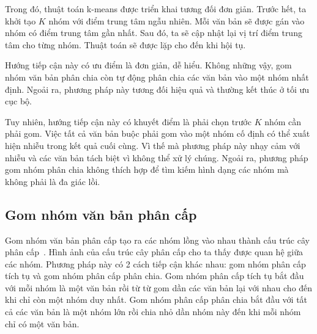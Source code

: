 Trong đó, thuật toán k-means được triển khai tương đối đơn giản.
Trước hết, ta khởi tạo $K$ nhóm với điểm trung tâm ngẫu nhiên.
Mỗi văn bản sẽ được gán vào nhóm có điểm trung tâm gần nhất.
Sau đó, ta sẽ cập nhật lại vị trí điểm trung tâm cho từng nhóm.
Thuật toán sẽ được lặp cho đến khi hội tụ.

Hướng tiếp cận này có ưu điểm là đơn giản, dễ hiểu.
Không những vậy, gom nhóm văn bản phân chia còn tự động phân chia các văn bản vào một nhóm nhất định.
Ngoải ra, phương pháp này tương đối hiệu quả và thường kết thúc ở tối ưu cục bộ.

Tuy nhiên, hướng tiếp cận này có khuyết điểm là phải chọn trước $K$ nhóm cần phải gom.
Việc tất cả văn bản buộc phải gom vào một nhóm cố định có thể xuất hiện nhiễu trong kết quả cuối cùng.
Vì thế mà phương pháp này nhạy cảm với nhiễu và các văn bản tách biệt vì không thể xử lý chúng.
Ngoải ra, phương pháp gom nhóm phân chia không thích hợp để tìm kiếm hình dạng các nhóm mà không phải là đa giác lồi.

%

\subsection{Gom nhóm văn bản phân cấp}
\label{sec:gnvbpc}
Gom nhóm văn bản phân cấp tạo ra các nhóm lồng vào nhau thành cấu trúc cây phân cấp~\cite{hierarchical-clustering}.
Hình ảnh của cấu trúc cây phân cấp cho ta thấy được quan hệ giữa các nhóm.
Phương pháp này có 2 cách tiếp cận khác nhau: gom nhóm phân cấp tích tụ  và gom nhóm phân cấp phân chia.
Gom nhóm phân cấp tích tụ bắt đầu với mỗi nhóm là một văn bản rồi từ từ gom dần các văn bản lại với nhau cho đến khi chỉ còn một nhóm duy nhất.
Gom nhóm phân cấp phân chia bắt đầu với tất cả các văn bản là một nhóm lớn rồi chia nhỏ dần nhóm này đến khi mỗi nhóm chỉ có một văn bản.


